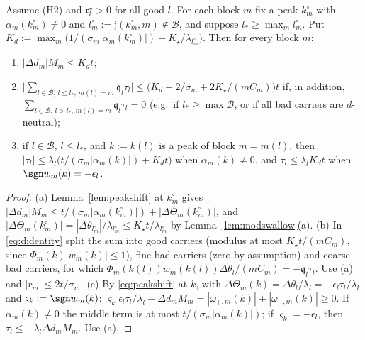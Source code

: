 \begin{lemma}\label{lem:badpeaks}
Assume \textup{(H2)} and $\mathfrak r^\star_l>0$ for all good $l$.  For
each block $m$ fix a peak $k^\circ_m$ with $\alpha_m(k^\circ_m)\ne0$ and
$l^\circ_m:=\mathfrak j(k^\circ_m,m)\notin\mathcal B$, and suppose
$l_*\ge\max_ml^\circ_m$.  Put $K_d:=\max_m\big(1/(\sigma_m|\alpha_m
(k^\circ_m)|)+K_\star/\lambda_{l^\circ_m}\big)$.  Then for every block $m$:
\begin{enumerate}
\item[(a)] $|\Delta d_m|M_m\le K_dt$;
\item[(b)] $\big|\sum_{l\in\mathcal B,\,l\le l_*,\,m(l)=m}\mathfrak q_l
\tau_l\big|\le\big(K_d+2/\sigma_m+2K_\star/(mC_m)\big)t$ if, in addition,
$\sum_{l\in\mathcal B,\,l>l_*,\,m(l)=m}\mathfrak q_l\tau_l=0$ \textup{(}e.g.\
if $l_*\ge\max\mathcal B$, or if all bad carriers are $d$-neutral\textup{)};
\item[(c)] if $l\in\mathcal B$, $l\le l_*$, and $k:=k(l)$ is a peak of
block $m=m(l)$, then $|\tau_l|\le\lambda_l\big(t/(\sigma_m|\alpha_m(k)|)+
K_dt\big)$ when $\alpha_m(k)\ne0$, and $\tau_l\le\lambda_lK_dt$ when
$\sgn w_m(k)=-\epsilon_l$.
\end{enumerate}
\end{lemma}

\begin{proof}
(a) Lemma~\ref{lem:peakshift} at $k^\circ_m$ gives $|\Delta d_m|M_m\le
t/(\sigma_m|\alpha_m(k^\circ_m)|)+|\Delta\Theta_m(k^\circ_m)|$, and
$|\Delta\Theta_m(k^\circ_m)|=|\Delta\theta_{l^\circ_m}|/\lambda_{l^\circ_m}\le
K_\star t/\lambda_{l^\circ_m}$ by Lemma~\ref{lem:modswallow}(a).
(b) In \eqref{eq:didentity} split the sum into good carriers (modulus at
most $K_\star t/(mC_m)$, since $\Phi_m(k)|w_m(k)|\le1$), fine bad carriers
(zero by assumption) and coarse bad carriers, for which
$\Phi_m(k(l))w_m(k(l))\Delta\theta_l/(mC_m)=-\mathfrak q_l\tau_l$.  Use (a)
and $|r_m|\le2t/\sigma_m$.
(c) By \eqref{eq:peakshift} at $k$, with $\Delta\Theta_m(k)=\Delta\theta_l/
\lambda_l=-\epsilon_l\tau_l/\lambda_l$ and $\varsigma_k:=\sgn w_m(k)$:
$\varsigma_k\epsilon_l\tau_l/\lambda_l-\Delta d_mM_m=|\omega_{+,m}(k)|+
|\omega_{-,m}(k)|\ge0$.  If $\alpha_m(k)\ne0$ the middle term is at most
$t/(\sigma_m|\alpha_m(k)|)$; if $\varsigma_k=-\epsilon_l$, then
$\tau_l\le-\lambda_l\Delta d_mM_m$.  Use (a).
\end{proof}

